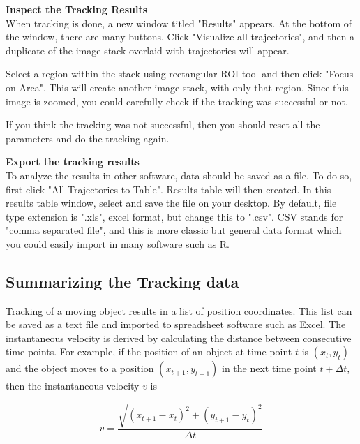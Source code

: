 \begin{indentexercise}{1}
\textbf{Inspect the Tracking Results}\\
When tracking is done, a new window titled "Results" appears. 
At the bottom of the window, there are many buttons. 
Click "Visualize all trajectories", and then a duplicate of 
the image stack overlaid with trajectories will appear. 

Select a region within the stack using rectangular ROI tool 
and then click "Focus on Area". This will create another image stack, 
with only that region. Since this image is zoomed, 
you could carefully check if the tracking was successful or not. 

If you think the tracking was not successful, 
then you should reset all the parameters and do the tracking again.

\textbf{Export the tracking results}\\
To analyze the results in other software, data should be saved as a file. To do
so, first click "All Trajectories to Table". Results table will then created. 
In this results table window, select  and save the
file on your desktop. By default, file type extension is ".xls", excel format, but change this to ".csv". 
CSV stands for "comma separated file", and this is more classic but general data format 
which you could easily import in many software such as R.

\end{indentexercise}

\subsection{Summarizing the Tracking data}

Tracking of a moving object results in a list of position coordinates.
This list can be saved as a text file and imported to spreadsheet
software such as Excel. The instantaneous velocity is derived by
calculating the distance between consecutive time points. For example,
if the position of an object at time point $t$ is
$(x_{t}, y_{t})$ and the object moves to a position
$(x_{t+1}, y_{t+1})$ in the next time point
$t + \Delta t$, then the instantaneous velocity $v$ is

\begin{equation}
v = \frac{\sqrt{(x_{t+1} - x_{t})^{2} + (y_{t+1} - y_{t})^{2}}}{\Delta t}
\end{equation}

